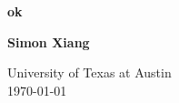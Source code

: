 \begin{titlepage}
    \begin{center}
        \vspace*{1cm}
 
        \Huge
        \textbf{ok}
 
        \vspace{0.5cm}
        \LARGE
    	

        \vspace{1.5cm}
 
        \textbf{Simon Xiang}
 
        \vfill
  
        \vspace{0.8cm}
 
        \Large
        University of Texas at Austin\\
        \today
 
    \end{center}
\end{titlepage}
